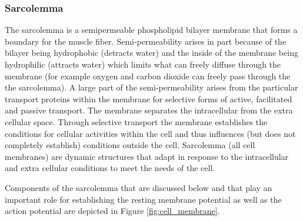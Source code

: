 \subsubsection{Sarcolemma}

The sarcolemma is a semipermeable phospholipid bilayer membrane that forms a boundary for the muscle fiber. Semi-permeability arises in part because of the bilayer being hydrophobic (detracts water) and the inside of the membrane being hydrophilic (attracts water) which limits what can freely diffuse through the membrane (for example oxygen and carbon dioxide can freely pass through the the sarcolemma). A large part of the semi-permeability arises from the particular transport proteins within the membrane for selective forms of active, facilitated and passive transport.\footnotemark{} The membrane separates the intracellular from the extra cellular space. Through selective transport the membrane establishes the conditions for cellular activities within the cell and thus influences (but does not completely establish) conditions outside the cell. Sarcolemma (all cell membranes) are dynamic structures that adapt in response to the intracellular and extra cellular conditions to meet the needs of the cell.

Components of the sarcolemma that are discussed below and that play an important role for establishing the resting membrane potential as well as the action potential are depicted in Figure \ref{fig:cell_membrane}. 

